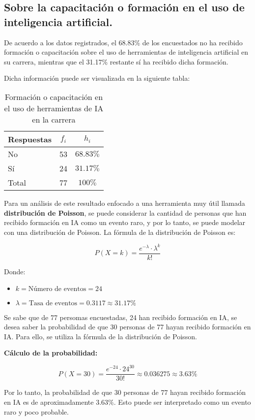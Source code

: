 \subsection{Sobre la capacitación o formación en el uso de inteligencia artificial.}



De acuerdo a los datos registrados, el 68.83\% de los encuestados no ha recibido formación o capacitación sobre el uso de herramientas de inteligencia artificial en su carrera, mientras que el 31.17\% restante sí ha recibido dicha formación.

Dicha información puede ser visualizada en la siguiente tabla:

\begin{table}[H]
  \centering
  \renewcommand{\arraystretch}{1.5}
  \begin{tabular}{l c c }
    \hline
    Respuestas & \(f_i\) & \(h_i\) \\
    \hline
    No & 53 & \(68.83\%\) \\
    Sí & 24 & \(31.17\%\) \\
    \hline
    Total & 77 & \(100\%\) \\
  \end{tabular}
  \caption{Formación o capacitación en el uso de herramientas de IA en la carrera}
  \label{tabla:formacionIA}
\end{table}

Para un análisis de este resultado enfocado a una herramienta muy útil llamada \textbf{distribución de Poisson}, se puede considerar la cantidad de personas que han recibido formación en IA como un evento raro, y por lo tanto, se puede modelar con una distribución de Poisson. La fórmula de la distribución de Poisson es:

\begin{equation*}
  P(X = k) = \dfrac{e^{-\lambda} \cdot \lambda^k}{k!}
\end{equation*}

Donde:
\begin{itemize}
  \item \(k = \text{Número de eventos} = 24\)
  \item \(\lambda = \text{Tasa de eventos} = 0.3117 \approx 31.17\%\)
\end{itemize}

Se sabe que de 77 persomas encuestadas, 24 han recibido formación en IA, se desea saber la probabilidad de que 30 personas de 77 hayan recibido formación en IA. Para ello, se utiliza la fórmula de la distribución de Poisson.

\textbf{Cálculo de la probabilidad:}

\begin{equation*}
  P(X = 30) = \dfrac{e^{-24} \cdot 24^{30}}{30!} \approx 0.036275 \approx 3.63\%
\end{equation*}

Por lo tanto, la probabilidad de que 30 personas de 77 hayan recibido formación en IA es de aproximadamente 3.63\%. Esto puede ser interpretado como un evento raro y poco probable.